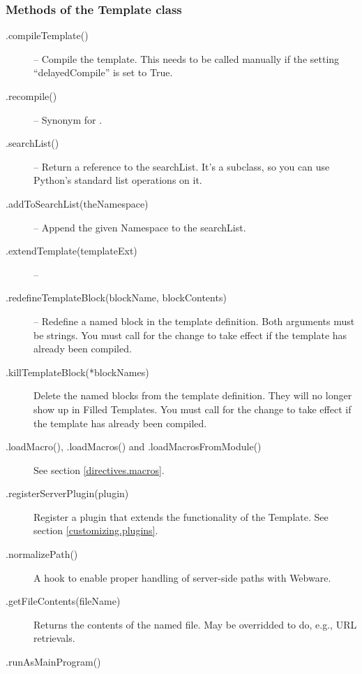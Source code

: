 \subsubsection{Methods of the Template class}
\label{puttingItTogether.template.methods}

\begin{description}
     
\item[.compileTemplate()] -- Compile the template.  This needs to be called
     manually if the setting ``delayedCompile'' is set to True.
     
\item[.recompile()] -- Synonym for .
     
\item[.searchList()] -- Return a reference to the searchList.  It's a
      subclass, so you can use Python's standard list operations
     on it.
     
\item[.addToSearchList(theNamespace)] -- Append the given Namespace to the
     searchList.
     
\item[.extendTemplate(templateExt)] --

\item[.redefineTemplateBlock(blockName, blockContents)] -- Redefine a named block
     in the template definition.  Both arguments must be strings.  You must call
      for the change to take effect if the template has
     already been compiled.
     
\item[.killTemplateBlock(*blockNames)] Delete the named blocks from the template
     definition.  They will no longer show up in Filled Templates. You must call
      for the change to take effect if the template has
     already been compiled.

     
\item[.loadMacro(), .loadMacros() and .loadMacrosFromModule()] See section
     \ref{directives.macros}.

\item[.registerServerPlugin(plugin)]  Register a plugin that extends the
     functionality of the Template.  See section \ref{customizing.plugins}.

\item[.normalizePath()] A hook to enable proper handling of server-side paths
     with Webware.

\item[.getFileContents(fileName)]  Returns the contents of the named
     file.  May be overridded to do, e.g., URL retrievals.

\item[.runAsMainProgram()]

\end{description}


